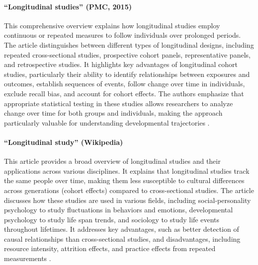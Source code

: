 \documentclass[../main.tex]{subfiles}
\begin{document}

\paragraph{``Longitudinal studies'' (PMC, 2015)}
This comprehensive overview explains how longitudinal studies employ continuous or repeated measures to follow individuals over prolonged periods. The article distinguishes between different types of longitudinal designs, including repeated cross-sectional studies, prospective cohort panels, representative panels, and retrospective studies. It highlights key advantages of longitudinal cohort studies, particularly their ability to identify relationships between exposures and outcomes, establish sequences of events, follow change over time in individuals, exclude recall bias, and account for cohort effects. The authors emphasize that appropriate statistical testing in these studies allows researchers to analyze change over time for both groups and individuals, making the approach particularly valuable for understanding developmental trajectories \citep{caruana2015longitudinal}.

\paragraph{``Longitudinal study'' (Wikipedia)}
This article provides a broad overview of longitudinal studies and their applications across various disciplines. It explains that longitudinal studies track the same people over time, making them less susceptible to cultural differences across generations (cohort effects) compared to cross-sectional studies. The article discusses how these studies are used in various fields, including social-personality psychology to study fluctuations in behaviors and emotions, developmental psychology to study life span trends, and sociology to study life events throughout lifetimes. It addresses key advantages, such as better detection of causal relationships than cross-sectional studies, and disadvantages, including resource intensity, attrition effects, and practice effects from repeated measurements \citep{wikipedia2024longitudinal}.
\end{document}
